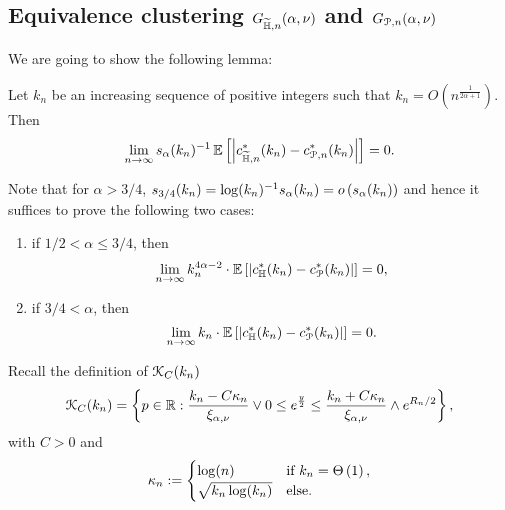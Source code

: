 \subsection{Equivalence clustering $G_{\widetilde{\mathbb{H}},n}(\alpha,\nu)$ and $G_{{\mathcal P},n}(\alpha,\nu)$}\label{ssec:coupling_HP_ast_P}

We are going to show the following lemma: 
\begin{lemma} \label{lem:equivalence_c_HP_P}
Let $k_n$ be an increasing sequence of positive integers such that 
$k_n= O(n^{\frac{1}{2\alpha +1}})$. Then
\[
	\lim_{n \to \infty} s_\alpha(k_n)^{-1} \, \mathbb{E}\left[\left|c_{\widetilde{\mathbb{H}},n}^\ast(k_n) - c_{{\mathcal P},n}^\ast(k_n)\right|\right] = 0.
\]
\end{lemma}

Note that for $\alpha > 3/4$, $s_{3/4}(k_n) = \log(k_n)^{-1} s_{\alpha}(k_n) = o\left(s_{\alpha}(k_n)\right)$ and hence it suffices to prove the following two cases:
\begin{enumerate}
\item if $1/2 < \alpha \leq 3/4$, then
\[
	\lim_{n\to \infty} k_n^{4\alpha -2}\cdot \mathbb{E}\left[\left|  c_{\mathbb{H}}^\ast(k_n) - c_{{\mathcal P}}^\ast(k_n)\right|\right]=0,
\]
\item if $3/4 < \alpha$, then
\[ 
	\lim_{n\to \infty} k_n \cdot \mathbb{E}\left[\left|  c_{\mathbb{H}}^\ast(k_n) - c_{{\mathcal P}}^\ast(k_n)\right|\right]=0.
\]
\end{enumerate}

Recall the definition of ${\mathcal K}_{C}(k_n)$
\[
	{\mathcal K}_C(k_n) = \left\{p \in {\ensuremath{\mathbb R}} : \frac{k_n - C \kappa_n}{\xi_{\alpha,\nu}} \vee 0 \le e^{\frac{y}{2}}
	\le \frac{k_n + C \kappa_n}{\xi_{\alpha,\nu}} \wedge e^{R_n/2} \right\},
\]
with $C > 0$ and 
\[
	\kappa_n := \begin{cases}
		\log(n) &\mbox{if } k_n = \Theta\left(1\right),\\
		\sqrt{k_n \log(k_n)} &\mbox{else.}
	\end{cases}
\]

